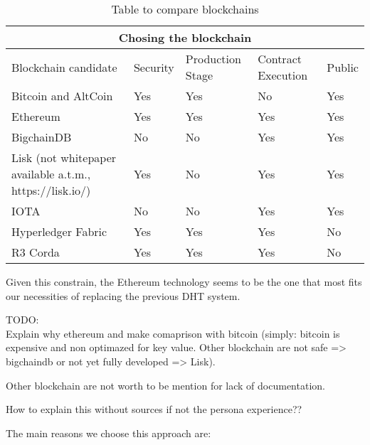 \begin{table}[h!]
\centering
\begin{tabular}{ |p{7cm}|p{2cm}|p{2cm}|p{2cm}|p{2cm}|  }
\hline
\multicolumn{5}{|c|}{Chosing the blockchain} \\
\hline
Blockchain candidate & Security & Production Stage & Contract Execution & Public \\
\hline
Bitcoin and AltCoin \cite{Nakamoto_bitcoin:a} & Yes & Yes & No\cite{Bitcoin_notTuringComplete} & Yes \\
\hline
Ethereum \cite{ethereum_whitepaper} & Yes & Yes & Yes & Yes \\
\hline
BigchainDB \cite{bigchaindb_whitepaper} & No \cite{_bigchaindb_bullshit} \ & No & Yes & Yes \\
\hline
Lisk (not whitepaper available a.t.m., https://lisk.io/)& Yes & No \cite{lisk_problems} & Yes & Yes \\
\hline
IOTA \cite{iota_whitepaper}& No \cite{iota_problems} & No & Yes & Yes \\
\hline
Hyperledger Fabric \cite{martindale_fabric:_2017}& Yes & Yes & Yes & No \\
\hline
R3 Corda \cite{corda_whitepaper}& Yes & Yes & Yes & No \\
\hline
\end{tabular}
\caption{Table to compare blockchains}
\label{table:1}
\end{table}



Given this constrain, the Ethereum technology seems to be the one that most fits our necessities of replacing the previous DHT system.

\begin{notation}
  TODO: \\
  Explain why ethereum and make comaprison with bitcoin (simply: bitcoin is expensive and non optimazed for key value. Other blockchain are not safe => bigchaindb or not yet fully developed => Lisk).

  Other blockchain are not worth to be mention for lack of documentation.

  How to explain this without sources if not the persona experience??
\end{notation}
The main reasons we choose this approach are:


